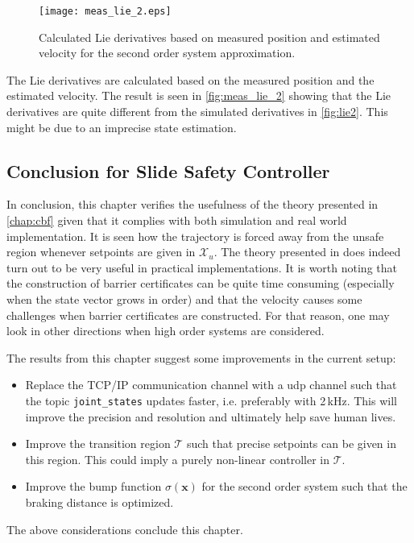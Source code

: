 \begin{figure}[H]
	\center
		\texttt{[image: meas\_lie\_2.eps]}
	\caption{Calculated Lie derivatives based on measured position and estimated velocity for the second order system approximation. }
    \label{fig:meas_lie_2}
\end{figure}
The Lie derivatives are calculated based on the measured position and the estimated velocity. The result is seen in \autoref{fig:meas_lie_2} showing that the Lie derivatives  are quite different from the simulated derivatives in \autoref{fig:lie2}. This might be due to an imprecise state estimation.

\subsection{Conclusion for Slide Safety Controller}\label{subsec:conclusion-slide-safety}
In conclusion, this chapter verifies the usefulness of the theory presented in \autoref{chap:cbf} given that it complies with both simulation and real world implementation. It is seen how the trajectory is forced away from the unsafe region whenever setpoints are given in $\mathcal{X}_u$. The theory presented in \citep{bib:org_control} does indeed turn out to be very useful in practical implementations. It is worth noting that the construction of barrier certificates can be quite time consuming (especially when the state vector grows in order) and that the velocity causes some challenges when barrier certificates are constructed. For that reason, one may look in other directions when high order systems are considered.

The results from this chapter suggest some improvements in the current setup:
\begin{itemize}
\item Replace the TCP/IP communication channel with a \gls{udp} channel such that the topic \texttt{joint\_states} updates faster, i.e. preferably with 2\,kHz. This will  improve the precision and resolution and ultimately help save human lives.
\item Improve the transition region $\mathcal{T}$ such that precise setpoints can be given in this region. This could imply a purely non-linear controller in $\mathcal{T}$.
\item Improve the bump function $\sigma(\mathbf{x})$ for the second order system such that the braking distance is optimized.
\end{itemize}
The above considerations conclude this chapter.